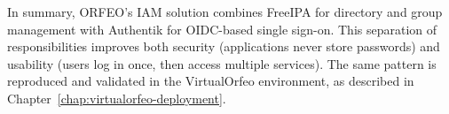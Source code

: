 \medskip

In summary, ORFEO’s IAM solution combines FreeIPA for directory and group 
management with Authentik for OIDC-based single sign-on. This separation of 
responsibilities improves both security (applications never store passwords) and 
usability (users log in once, then access multiple services). The same pattern 
is reproduced and validated in the VirtualOrfeo environment, as described in 
Chapter~\ref{chap:virtualorfeo-deployment}.
